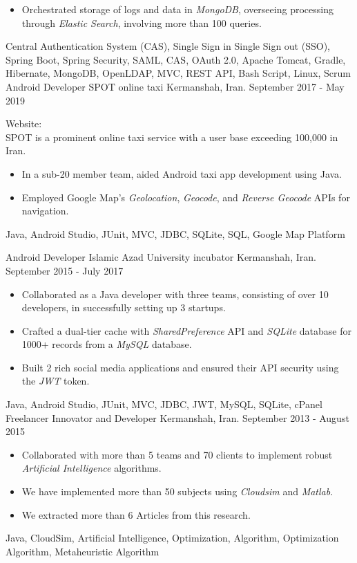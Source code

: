 \begin{experiences}
{\begin{itemize}
\item Orchestrated storage of logs and data in \emph{MongoDB}, overseeing processing through \emph{Elastic Search}, involving more than 100 queries.
\end{itemize}
}{Central Authentication System (CAS), Single Sign in Single Sign out (SSO), Spring Boot, Spring Security, SAML, CAS, OAuth 2.0, Apache Tomcat, Gradle, Hibernate, MongoDB, OpenLDAP, MVC, REST API, Bash Script, Linux, Scrum}
\emptySeparator
\experience
  {}
  {Android Developer}
  {SPOT online taxi}
  {Kermanshah, Iran. \hspace{140 pt} September 2017 - May 2019}
  {}
  {
  Website: \\
  SPOT is a prominent online taxi service with a user base exceeding 100,000 in Iran. 
  \begin{itemize}
    \item In a sub-20 member team, aided Android taxi app development using Java.
    \item Employed Google Map's \emph{Geolocation}, \emph{Geocode}, and \emph{Reverse Geocode} APIs for navigation.\end{itemize}
  }{Java, Android Studio, JUnit, MVC, JDBC, SQLite, SQL, Google Map Platform}

\emptySeparator

\experience
{}
{Android Developer}
{Islamic Azad University incubator}
{Kermanshah, Iran. \hspace{70 pt} September 2015 - July 2017}
{}
{
\begin{itemize}
\item Collaborated as a Java developer with three teams, consisting of over 10 developers, in successfully setting up 3 startups.
\item Crafted a dual-tier cache with \emph{SharedPreference} API and \emph{SQLite} database for 1000+ records from a \emph{MySQL} database.
\item Built 2 rich social media applications and ensured their API security using the \emph{JWT} token.
\end{itemize}
}{Java, Android Studio, JUnit, MVC, JDBC, JWT, MySQL, SQLite, cPanel}
\emptySeparator
\experience
{}
{Freelancer Innovator and Developer}
{}
{Kermanshah, Iran. \hspace{140 pt} September 2013 - August 2015}
{}
{
\begin{itemize}
\item Collaborated with more than 5 teams and 70 clients to implement robust \emph{Artificial Intelligence} algorithms.
\item We have implemented more than 50 subjects using \emph{Cloudsim} and \emph{Matlab}.
\item We extracted more than 6 Articles from this research.
\end{itemize}
}{Java, CloudSim, Artificial Intelligence, Optimization, Algorithm, Optimization Algorithm, Metaheuristic Algorithm}
\end{experiences}